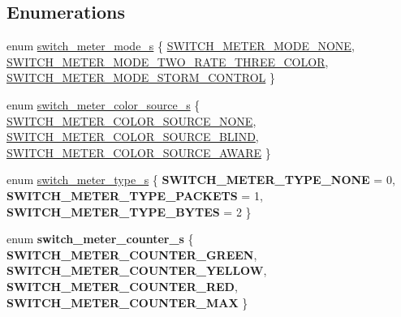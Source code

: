 \subsection*{Enumerations}
\begin{DoxyCompactItemize}
\item 
enum \hyperlink{group__Meters_ga77f75da70758cac1c9fb171fa93f8cc2}{switch\+\_\+meter\+\_\+mode\+\_\+s} \{ \hyperlink{group__Meters_gga77f75da70758cac1c9fb171fa93f8cc2a9e3ebd30b7c4d9e38b80f93a9ac78600}{S\+W\+I\+T\+C\+H\+\_\+\+M\+E\+T\+E\+R\+\_\+\+M\+O\+D\+E\+\_\+\+N\+O\+N\+E}, 
\hyperlink{group__Meters_gga77f75da70758cac1c9fb171fa93f8cc2a4ce908b0813c182f0d4a90677829e085}{S\+W\+I\+T\+C\+H\+\_\+\+M\+E\+T\+E\+R\+\_\+\+M\+O\+D\+E\+\_\+\+T\+W\+O\+\_\+\+R\+A\+T\+E\+\_\+\+T\+H\+R\+E\+E\+\_\+\+C\+O\+L\+O\+R}, 
\hyperlink{group__Meters_gga77f75da70758cac1c9fb171fa93f8cc2ae05c75b4416550a9ef3670e715ef1793}{S\+W\+I\+T\+C\+H\+\_\+\+M\+E\+T\+E\+R\+\_\+\+M\+O\+D\+E\+\_\+\+S\+T\+O\+R\+M\+\_\+\+C\+O\+N\+T\+R\+O\+L}
 \}
\item 
enum \hyperlink{group__Meters_ga2eeabdade8a78d5e09693abf1f202539}{switch\+\_\+meter\+\_\+color\+\_\+source\+\_\+s} \{ \hyperlink{group__Meters_gga2eeabdade8a78d5e09693abf1f202539a59030f7f1690943aec6727e36de2dfdf}{S\+W\+I\+T\+C\+H\+\_\+\+M\+E\+T\+E\+R\+\_\+\+C\+O\+L\+O\+R\+\_\+\+S\+O\+U\+R\+C\+E\+\_\+\+N\+O\+N\+E}, 
\hyperlink{group__Meters_gga2eeabdade8a78d5e09693abf1f202539a1991f1bad53873284e7586a97677779e}{S\+W\+I\+T\+C\+H\+\_\+\+M\+E\+T\+E\+R\+\_\+\+C\+O\+L\+O\+R\+\_\+\+S\+O\+U\+R\+C\+E\+\_\+\+B\+L\+I\+N\+D}, 
\hyperlink{group__Meters_gga2eeabdade8a78d5e09693abf1f202539ad31cd269078c19d550d672a6e4cd2a8a}{S\+W\+I\+T\+C\+H\+\_\+\+M\+E\+T\+E\+R\+\_\+\+C\+O\+L\+O\+R\+\_\+\+S\+O\+U\+R\+C\+E\+\_\+\+A\+W\+A\+R\+E}
 \}
\item 
enum \hyperlink{group__Meters_ga280b2958172e3ad05fee3ffdb47b8113}{switch\+\_\+meter\+\_\+type\+\_\+s} \{ {\bfseries S\+W\+I\+T\+C\+H\+\_\+\+M\+E\+T\+E\+R\+\_\+\+T\+Y\+P\+E\+\_\+\+N\+O\+N\+E} = 0, 
{\bfseries S\+W\+I\+T\+C\+H\+\_\+\+M\+E\+T\+E\+R\+\_\+\+T\+Y\+P\+E\+\_\+\+P\+A\+C\+K\+E\+T\+S} = 1, 
{\bfseries S\+W\+I\+T\+C\+H\+\_\+\+M\+E\+T\+E\+R\+\_\+\+T\+Y\+P\+E\+\_\+\+B\+Y\+T\+E\+S} = 2
 \}
\item 
\hypertarget{group__Meters_ga619cc21435f64cc51cd38b4e57bf5ce5}{enum {\bfseries switch\+\_\+meter\+\_\+counter\+\_\+s} \{ {\bfseries S\+W\+I\+T\+C\+H\+\_\+\+M\+E\+T\+E\+R\+\_\+\+C\+O\+U\+N\+T\+E\+R\+\_\+\+G\+R\+E\+E\+N}, 
{\bfseries S\+W\+I\+T\+C\+H\+\_\+\+M\+E\+T\+E\+R\+\_\+\+C\+O\+U\+N\+T\+E\+R\+\_\+\+Y\+E\+L\+L\+O\+W}, 
{\bfseries S\+W\+I\+T\+C\+H\+\_\+\+M\+E\+T\+E\+R\+\_\+\+C\+O\+U\+N\+T\+E\+R\+\_\+\+R\+E\+D}, 
{\bfseries S\+W\+I\+T\+C\+H\+\_\+\+M\+E\+T\+E\+R\+\_\+\+C\+O\+U\+N\+T\+E\+R\+\_\+\+M\+A\+X}
 \}}\label{group__Meters_ga619cc21435f64cc51cd38b4e57bf5ce5}


\end{DoxyCompactItemize}
